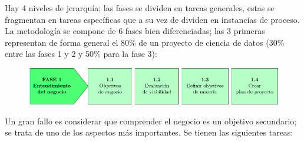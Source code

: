 Hay 4 niveles de jerarquía: las fases se dividen en tareas generales, estas se fragmentan en tareas específicas que a su vez de dividen en instancias de proceso. La metodología se compone de 6 fases bien diferenciadas; las 3 primeras representan de forma general el 80\% de un proyecto de ciencia de datos (30\% entre las fases 1 y 2 y 50\% para la fase 3): 

\begin{figure}[H]
\centering
\includegraphics[width=\textwidth]{fotos/13.pdf}
\end{figure}

Un gran fallo es considerar que comprender el negocio es un objetivo secundario; se trata de uno de los aspectos más importantes. Se tienen las siguientes tareas:
